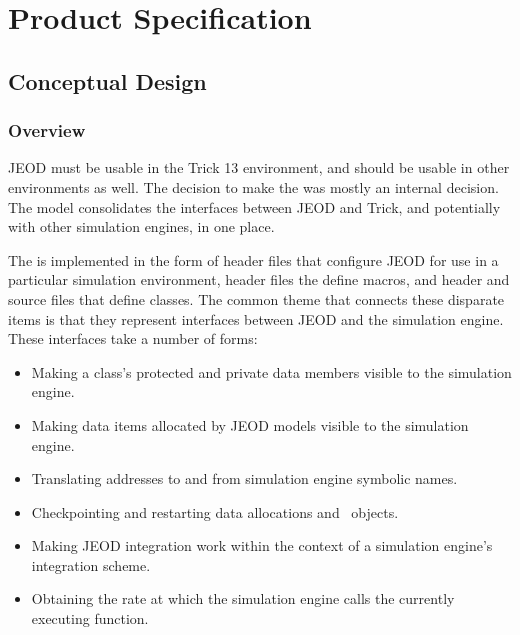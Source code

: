 %
%

\chapter{Product Specification}\label{ch:spec}

\section{Conceptual Design}
\label{sec:conceptual_design}

\subsection{Overview}

JEOD must be usable in the Trick 13 environment,
and should be usable in other environments as well.
The decision to make the \ModelDesc was mostly an internal decision.
The model consolidates the interfaces between JEOD and Trick,
and potentially with other simulation engines, in one place.

The \ModelDesc is implemented in the form of
header files that configure JEOD for use in a particular simulation environment,
header files the define macros,
and header and source files that define classes.
The common theme that connects these disparate items is
that they represent interfaces between JEOD and the simulation engine.
These interfaces take a number of forms:
\begin{itemize}
\item Making a class's protected and private data members
  visible to the simulation engine.
\item Making data items allocated by JEOD models
  visible to the simulation engine.
\item Translating addresses to and from simulation engine symbolic names.
\item Checkpointing and restarting data allocations and \CONTAINER\ objects.
\item Making JEOD integration work within the context
  of a simulation engine's integration scheme.
\item Obtaining the rate at which the simulation engine calls
  the currently executing function.
\end{itemize}

